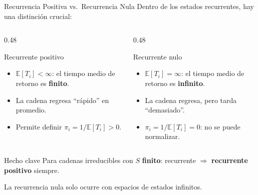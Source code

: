 \documentclass[aspectratio=1610, 10pt]{beamer}
\newcommand{\E}{\mathbb{E}}
\begin{document}
\begin{frame}{Recurrencia Positiva vs.\ Recurrencia Nula}
  Dentro de los estados recurrentes, hay una distinci\'{o}n crucial:

  \vspace{4pt}
  \begin{columns}[T]
    \begin{column}{0.48\textwidth}
      \begin{block}{Recurrente positivo}
        \begin{itemize}
          \item $\E[T_i] < \infty$: el tiempo medio de retorno es \textbf{finito}.
          \item La cadena regresa ``r\'{a}pido'' en promedio.
          \item Permite definir $\pi_i = 1/\E[T_i] > 0$.
        \end{itemize}
      \end{block}
    \end{column}
    \begin{column}{0.48\textwidth}
      \begin{alertblock}{Recurrente nulo}
        \begin{itemize}
          \item $\E[T_i] = \infty$: el tiempo medio de retorno es \textbf{infinito}.
          \item La cadena regresa, pero tarda ``demasiado''.
          \item $\pi_i = 1/\E[T_i] = 0$: no se puede normalizar.
        \end{itemize}
      \end{alertblock}
    \end{column}
  \end{columns}

  \vspace{8pt}
  \begin{exampleblock}{Hecho clave}
    Para cadenas irreducibles con $S$ \textbf{finito}:
    recurrente $\Rightarrow$ \textbf{recurrente positivo} siempre.

    La recurrencia nula solo ocurre con espacios de estados infinitos.
  \end{exampleblock}
\end{frame}
\end{document}
